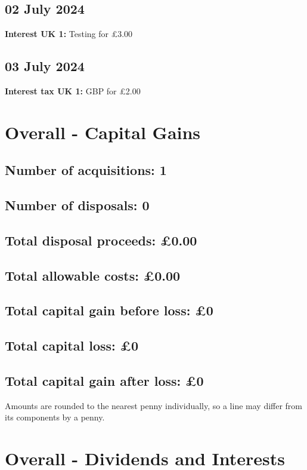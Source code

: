 \documentclass{article}
\begin{document}
\subsection*{02 July 2024}
\textbf{Interest UK 1:} Testing for £3.00



\subsection*{03 July 2024}
\textbf{Interest tax UK 1:} GBP for £2.00



\clearpage
\section*{Overall - Capital Gains}
\subsection*{Number of acquisitions: 1}
\subsection*{Number of disposals: 0}
\subsection*{Total disposal proceeds: £0.00}
\subsection*{Total allowable costs: £0.00}
\subsection*{Total capital gain before loss: £0}
\subsection*{Total capital loss: £0}
\subsection*{Total capital gain after loss: £0}
\vspace{1em}
Amounts are rounded to the nearest penny individually, so a line may differ from its components by a penny.
\vspace{2em}
\section*{Overall - Dividends and Interests}
\end{document}
